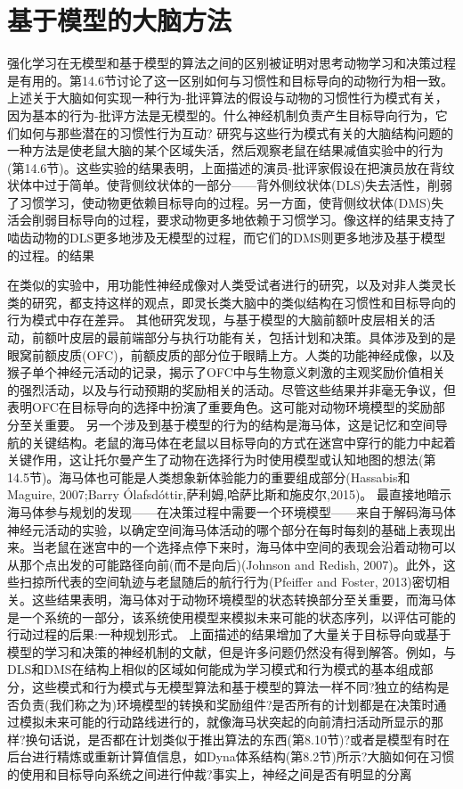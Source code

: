 \section{基于模型的大脑方法}

强化学习在无模型和基于模型的算法之间的区别被证明对思考动物学习和决策过程是有用的。第14.6节讨论了这一区别如何与习惯性和目标导向的动物行为相一致。上述关于大脑如何实现一种行为-批评算法的假设与动物的习惯性行为模式有关，因为基本的行为-批评方法是无模型的。什么神经机制负责产生目标导向行为，它们如何与那些潜在的习惯性行为互动?
研究与这些行为模式有关的大脑结构问题的一种方法是使老鼠大脑的某个区域失活，然后观察老鼠在结果减值实验中的行为(第14.6节)。这些实验的结果表明，上面描述的演员-批评家假设在把演员放在背纹状体中过于简单。使背侧纹状体的一部分——背外侧纹状体(DLS)失去活性，削弱了习惯学习，使动物更依赖目标导向的过程。另一方面，使背侧纹状体(DMS)失活会削弱目标导向的过程，要求动物更多地依赖于习惯学习。像这样的结果支持了啮齿动物的DLS更多地涉及无模型的过程，而它们的DMS则更多地涉及基于模型的过程。的结果

在类似的实验中，用功能性神经成像对人类受试者进行的研究，以及对非人类灵长类的研究，都支持这样的观点，即灵长类大脑中的类似结构在习惯性和目标导向的行为模式中存在差异。
其他研究发现，与基于模型的大脑前额叶皮层相关的活动，前额叶皮层的最前端部分与执行功能有关，包括计划和决策。具体涉及到的是眼窝前额皮质(OFC)，前额皮质的部分位于眼睛上方。人类的功能神经成像，以及猴子单个神经元活动的记录，揭示了OFC中与生物意义刺激的主观奖励价值相关的强烈活动，以及与行动预期的奖励相关的活动。尽管这些结果并非毫无争议，但表明OFC在目标导向的选择中扮演了重要角色。这可能对动物环境模型的奖励部分至关重要。
另一个涉及到基于模型的行为的结构是海马体，这是记忆和空间导航的关键结构。老鼠的海马体在老鼠以目标导向的方式在迷宫中穿行的能力中起着关键作用，这让托尔曼产生了动物在选择行为时使用模型或认知地图的想法(第14.5节)。海马体也可能是人类想象新体验能力的重要组成部分(Hassabis和Maguire, 2007;Barry Ólafsdóttir,萨利姆,哈萨比斯和施皮尔,2015)。
最直接地暗示海马体参与规划的发现——在决策过程中需要一个环境模型——来自于解码海马体神经元活动的实验，以确定空间海马体活动的哪个部分在每时每刻的基础上表现出来。当老鼠在迷宫中的一个选择点停下来时，海马体中空间的表现会沿着动物可以从那个点出发的可能路径向前(而不是向后)(Johnson and Redish, 2007)。此外，这些扫掠所代表的空间轨迹与老鼠随后的航行行为(Pfeiffer and Foster, 2013)密切相关。这些结果表明，海马体对于动物环境模型的状态转换部分至关重要，而海马体是一个系统的一部分，该系统使用模型来模拟未来可能的状态序列，以评估可能的行动过程的后果:一种规划形式。
上面描述的结果增加了大量关于目标导向或基于模型的学习和决策的神经机制的文献，但是许多问题仍然没有得到解答。例如，与DLS和DMS在结构上相似的区域如何能成为学习模式和行为模式的基本组成部分，这些模式和行为模式与无模型算法和基于模型的算法一样不同?独立的结构是否负责(我们称之为)环境模型的转换和奖励组件?是否所有的计划都是在决策时通过模拟未来可能的行动路线进行的，就像海马状突起的向前清扫活动所显示的那样?换句话说，是否都在计划类似于推出算法的东西(第8.10节)?或者是模型有时在后台进行精炼或重新计算值信息，如Dyna体系结构(第8.2节)所示?大脑如何在习惯的使用和目标导向系统之间进行仲裁?事实上，神经之间是否有明显的分离

